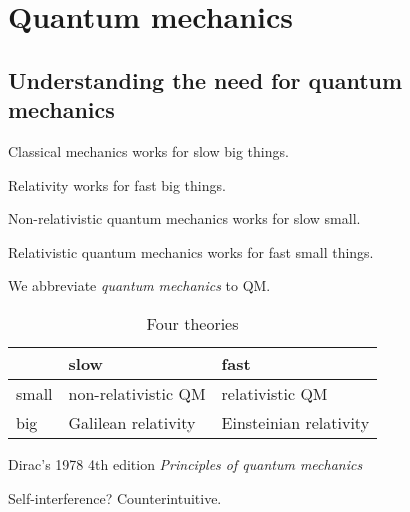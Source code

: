 \chapter{Quantum mechanics}

\cite{manousakis2016practical}

\section{Understanding the need for quantum mechanics}

Classical mechanics works for slow big things.

Relativity works for fast big things.

Non-relativistic quantum mechanics works for slow small.

Relativistic quantum mechanics works for fast small things.

We abbreviate \emph{quantum mechanics} to QM.

\begin{table}[h]
    \centering
    \begin{tabular}{l|ll}
        & slow & fast
        \\
        \hline
        small & non-relativistic QM & relativistic QM
        \\
        big & Galilean relativity & Einsteinian relativity
    \end{tabular}
    \caption{Four theories}
\end{table}




Dirac's 1978 4th edition \emph{Principles of quantum mechanics} \cite{dirac1978principles}

Self-interference? Counterintuitive.



